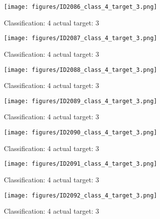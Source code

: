 \begin{figure}[h!]
\begin{center}
\texttt{[image: figures/ID2086\_class\_4\_target\_3.png]}
\end{center}
\caption{ Classification: 4 actual target: 3}
\label{fig:ID2086_class_4_target_3}
\end{figure}
\begin{figure}[h!]
\begin{center}
\texttt{[image: figures/ID2087\_class\_4\_target\_3.png]}
\end{center}
\caption{ Classification: 4 actual target: 3}
\label{fig:ID2087_class_4_target_3}
\end{figure}
\begin{figure}[h!]
\begin{center}
\texttt{[image: figures/ID2088\_class\_4\_target\_3.png]}
\end{center}
\caption{ Classification: 4 actual target: 3}
\label{fig:ID2088_class_4_target_3}
\end{figure}
\begin{figure}[h!]
\begin{center}
\texttt{[image: figures/ID2089\_class\_4\_target\_3.png]}
\end{center}
\caption{ Classification: 4 actual target: 3}
\label{fig:ID2089_class_4_target_3}
\end{figure}
\begin{figure}[h!]
\begin{center}
\texttt{[image: figures/ID2090\_class\_4\_target\_3.png]}
\end{center}
\caption{ Classification: 4 actual target: 3}
\label{fig:ID2090_class_4_target_3}
\end{figure}
\begin{figure}[h!]
\begin{center}
\texttt{[image: figures/ID2091\_class\_4\_target\_3.png]}
\end{center}
\caption{ Classification: 4 actual target: 3}
\label{fig:ID2091_class_4_target_3}
\end{figure}
\begin{figure}[h!]
\begin{center}
\texttt{[image: figures/ID2092\_class\_4\_target\_3.png]}
\end{center}
\caption{ Classification: 4 actual target: 3}
\label{fig:ID2092_class_4_target_3}
\end{figure}
